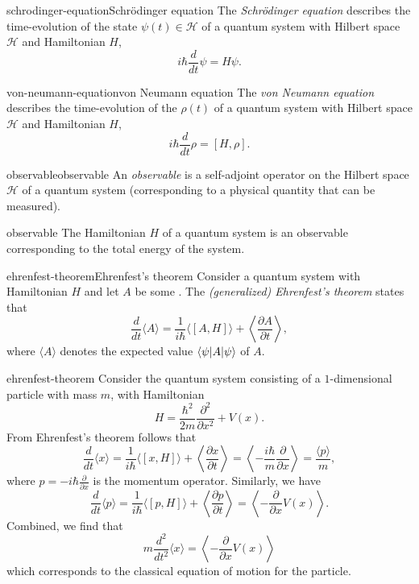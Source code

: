 \begin{topic}{schrodinger-equation}{Schrödinger equation}
    The \emph{Schrödinger equation} describes the time-evolution of the state $\psi(t) \in \mathcal{H}$ of a quantum system with Hilbert space $\mathcal{H}$ and Hamiltonian $H$,
    \[ i \hbar \frac{d}{dt} \psi = H \psi . \]
\end{topic}

\begin{topic}{von-neumann-equation}{von Neumann equation}
    The \emph{von Neumann equation} describes the time-evolution of the  $\rho(t)$ of a quantum system with Hilbert space $\mathcal{H}$ and Hamiltonian $H$,
    \[ i \hbar \frac{d}{dt} \rho = [H, \rho] . \]
\end{topic}

\begin{topic}{observable}{observable}
    An \emph{observable} is a self-adjoint operator on the Hilbert space $\mathcal{H}$ of a quantum system (corresponding to a physical quantity that can be measured).
\end{topic}

\begin{example}{observable}
    The Hamiltonian $H$ of a quantum system is an observable corresponding to the total energy of the system.
\end{example}

\begin{topic}{ehrenfest-theorem}{Ehrenfest's theorem}
    Consider a quantum system with Hamiltonian $H$ and let $A$ be some . The \emph{(generalized) Ehrenfest's theorem} states that 
    \[ \frac{d}{dt} \langle A \rangle = \frac{1}{i \hbar} \langle [A, H] \rangle + \left\langle \frac{\partial A}{\partial t} \right\rangle , \]
    where $\langle A \rangle$ denotes the expected value $\langle\psi| A |\psi\rangle$ of $A$.
\end{topic}

\begin{example}{ehrenfest-theorem}
    Consider the quantum system consisting of a $1$-dimensional particle with mass $m$, with Hamiltonian
    \[ H = \frac{\hbar^2}{2 m} \frac{\partial^2}{\partial x^2} + V(x) . \]
    From Ehrenfest's theorem follows that
    \[ \frac{d}{dt} \langle x \rangle = \frac{1}{i \hbar} \langle [x, H] \rangle + \left\langle \frac{\partial x}{\partial t} \right\rangle = \left\langle - \frac{i \hbar}{m} \frac{\partial}{\partial x} \right\rangle = \frac{\langle p \rangle}{m} , \]
    where $p = -i \hbar \frac{\partial}{\partial x}$ is the momentum operator. Similarly, we have
    \[ \frac{d}{dt} \langle p \rangle = \frac{1}{i \hbar} \langle [p, H] \rangle + \left\langle \frac{\partial p}{\partial t} \right\rangle = \left\langle - \frac{\partial}{\partial x} V(x) \right\rangle . \]
    Combined, we find that
    \[ m \frac{d^2}{d t^2} \langle x \rangle = \left\langle - \frac{\partial}{\partial x} V(x) \right\rangle \]
    which corresponds to the classical equation of motion for the particle.
\end{example}
